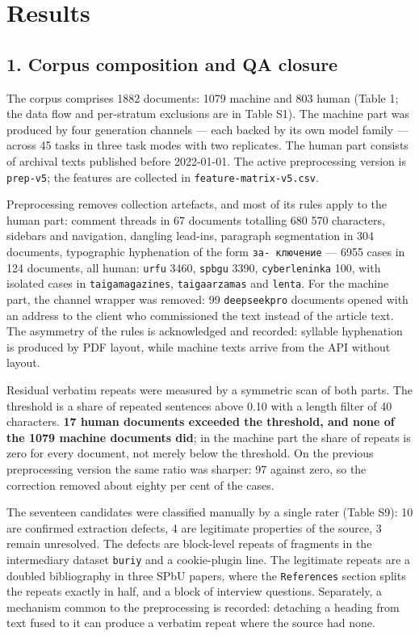 \documentclass[11pt,a4paper]{article}
\renewcommand{\_}{\textunderscore\allowbreak}
\begin{document}
\section{Results}

\subsection{1. Corpus composition and QA closure}

The corpus comprises 1882 documents: 1079 machine and 803 human (Table 1; the
data flow and per-stratum exclusions are in Table S1). The machine part was
produced by four generation channels — each backed by its own model family — across 45 tasks in three task modes with two
replicates. The human part consists of archival texts published before
2022-01-01. The active preprocessing version is \texttt{prep-\allowbreak{}v5}; the features are
collected in \texttt{feature-\allowbreak{}matrix-\allowbreak{}v5.csv}.

Preprocessing removes collection artefacts, and most of its rules apply to the
human part: comment threads in 67 documents totalling 680 570 characters,
sidebars and navigation, dangling lead-ins, paragraph segmentation in 304
documents, typographic hyphenation of the form \texttt{\foreignlanguage{russian}{за-\allowbreak{} ключение}} — 6955 cases in
124 documents, all human: \texttt{urfu} 3460, \texttt{spbgu} 3390, \texttt{cyberleninka} 100, with
isolated cases in \texttt{taiga\_magazines}, \texttt{taiga\_arzamas} and \texttt{lenta}. For the
machine part, the channel wrapper was removed: 99 \texttt{deepseek\_pro} documents
opened with an address to the client who commissioned the text instead of the article text.
The asymmetry of the rules is acknowledged and recorded: syllable hyphenation is
produced by PDF layout, while machine texts arrive from the API without layout.

Residual verbatim repeats were measured by a symmetric scan of both parts. The
threshold is a share of repeated sentences above 0.10 with a length filter of
40 characters. \textbf{17 human documents exceeded the threshold, and none of the
1079 machine documents did}; in the machine part the share of repeats is zero
for every document, not merely below the threshold. On the previous
preprocessing version the same ratio was sharper: 97 against zero, so the
correction removed about eighty per cent of the cases.

The seventeen candidates were classified manually by a single rater (Table
S9): 10 are confirmed extraction defects, 4 are legitimate properties of the
source, 3 remain unresolved. The defects are block-level repeats of fragments
in the intermediary dataset \texttt{buriy\_2014} and a cookie-plugin line. The
legitimate repeats are a doubled bibliography in three SPbU papers, where the
\texttt{References} section splits the repeats exactly in half, and a block of
interview questions. Separately, a mechanism common to the preprocessing is
recorded: detaching a heading from text fused to it can produce a verbatim
repeat where the source had none.
\end{document}
